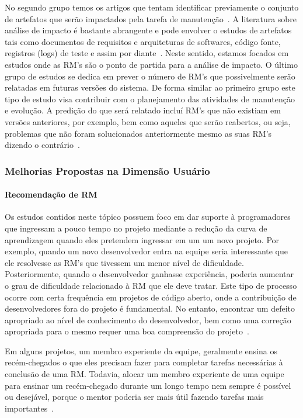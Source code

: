 No segundo grupo temos os artigos que tentam identificar previamente o conjunto
de artefatos que serão impactados pela tarefa de manutenção~\cite{Nagwani2010}.
A literatura sobre análise de impacto é bastante abrangente e pode envolver o
estudos de artefatos tais como documentos de requisitos e arquiteturas de
softwares, código fonte, registros (logs) de teste e assim por
diante~\cite{cavalcanti2014challenges}. Neste sentido, estamos focados em
estudos onde as RM's são o ponto de partida para a análise de impacto. O último
grupo de estudos se dedica em prever o número de RM's que possivelmente serão
relatadas em futuras versões do sistema. De forma similar ao primeiro grupo este
tipo de estudo visa contribuir com o planejamento das atividades de manutenção e
evolução. A predição do que será relatado incluí RM's que não existiam em
versões anteriores, por exemplo, bem como aqueles que serão reabertos, ou seja,
problemas que não foram solucionados anteriormente mesmo as suas RM's dizendo o
contrário~\cite{xia2015automatic}.

\subsubsection{Melhorias Propostas na Dimensão Usuário}
\label{ssub:melhorias_dim_usuario}

\paragraph{Recomendação de RM} Os estudos contidos neste tópico possuem foco em
dar suporte à programadores que ingressam a pouco tempo no projeto mediante a
redução da curva de aprendizagem quando eles pretendem ingressar em um um novo
projeto. Por exemplo, quando um novo desenvolvedor entra na equipe seria
interessante que ele resolvesse as RM's que tivessem um menor nível de
dificuldade. Posteriormente, quando o desenvolvedor ganhasse experiência,
poderia aumentar o grau de dificuldade relacionado à RM que ele deve tratar.
Este tipo de processo ocorre com certa frequência em projetos de código aberto,
onde a contribuição de desenvolvedores fora do projeto é fundamental. No
entanto, encontrar um defeito apropriado ao nível de conhecimento do
desenvolvedor, bem como uma correção apropriada para o mesmo requer uma boa
compreensão do projeto~\cite{Wang2011bug}.

Em alguns projetos, um membro experiente da equipe, geralmente ensina os
recém-chegados o que eles precisam fazer para completar tarefas necessárias à
conclusão de uma RM\@. Todavia, alocar um membro experiente de uma equipe para
ensinar um recém-chegado durante um longo tempo nem sempre é possível ou
desejável, porque o mentor poderia ser mais útil fazendo tarefas mais
importantes~\cite{malheiros2012source}.

